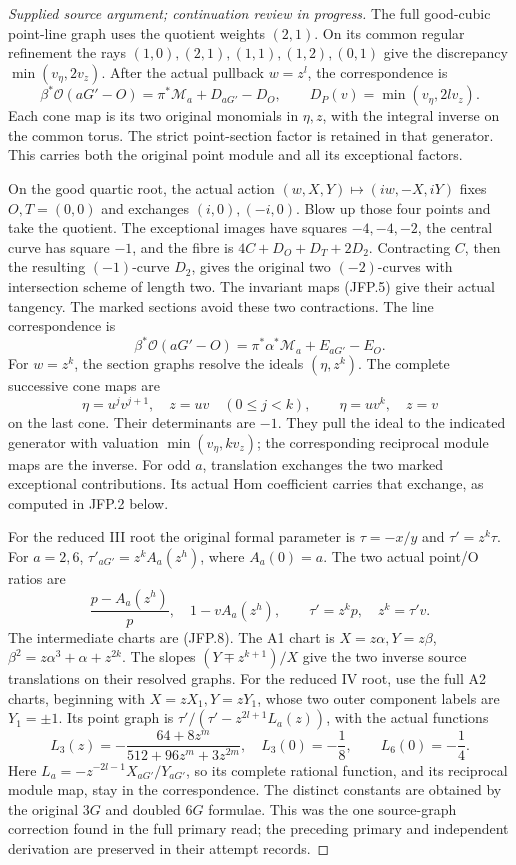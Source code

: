 \begin{proof}[Supplied source argument; continuation review in progress]
The full good-cubic point-line graph uses the quotient weights
\((2,1)\). On its common regular refinement the rays
\((1,0),(2,1),(1,1),(1,2),(0,1)\) give the discrepancy
\(\min(v_\eta,2v_z)\). After the actual pullback \(w=z^l\),
the correspondence is
\[
 \beta^*\mathcal O(aG'-O)=\pi^*\mathcal M_a+D_{aG'}-D_O,
 \qquad D_P(v)=\min(v_\eta,2l v_z).
\tag{JFP.6}
\]
Each cone map is its two original monomials in \(\eta,z\), with
the integral inverse on the common torus. The strict point-section
factor is retained in that generator. This carries both the original
point module and all its exceptional factors.

On the good quartic root, the actual action
\((w,X,Y)\mapsto(iw,-X,iY)\) fixes \(O,T=(0,0)\) and exchanges
\((i,0),(-i,0)\). Blow up those four points and take the quotient.
The exceptional images have squares \(-4,-4,-2\), the central
curve has square \(-1\), and the fibre is
\(4C+D_O+D_T+2D_2\). Contracting \(C\), then the resulting
\((-1)\)-curve \(D_2\), gives the original two \((-2)\)-curves
with intersection scheme of length two. The invariant maps (JFP.5)
give their actual tangency. The marked sections avoid these two
contractions. The line correspondence is
\[
 \beta^*\mathcal O(aG'-O)
 =\pi^*\alpha^*\mathcal M_a+E_{aG'}-E_O.
\tag{JFP.7}
\]
For \(w=z^k\), the section graphs resolve the ideals
\((\eta,z^k)\). The complete successive cone maps are
\[
 \eta=u^jv^{j+1},\quad z=uv\quad(0\le j<k),
 \qquad \eta=uv^k,\quad z=v
\tag{JFP.8}
\]
on the last cone. Their determinants are \(-1\). They pull the
ideal to the indicated generator with valuation
\(\min(v_\eta,k v_z)\); the corresponding reciprocal module maps
are the inverse. For odd \(a\), translation exchanges the two
marked exceptional contributions. Its actual Hom coefficient
carries that exchange, as computed in JFP.2 below.

For the reduced III root the original formal parameter is
\(\tau=-x/y\) and \(\tau'=z^k\tau\). For \(a=2,6\),
\(\tau'_{aG'}=z^kA_a(z^h)\), where \(A_a(0)=a\).
The two actual point/O ratios are
\[
 \frac{p-A_a(z^h)}p,\quad 1-vA_a(z^h),
 \qquad \tau'=z^kp,\quad z^k=\tau'v.
\tag{JFP.9}
\]
The intermediate charts are (JFP.8). The A1 chart is
\(X=z\alpha,Y=z\beta\),
\(\beta^2=z\alpha^3+\alpha+z^{2k}\). The slopes
\((Y\mp z^{k+1})/X\) give the two inverse source translations
on their resolved graphs. For the reduced IV root, use the full
A2 charts, beginning with \(X=zX_1,Y=zY_1\), whose two outer
component labels are \(Y_1=\pm1\). Its point graph is
\(\tau'/(\tau'-z^{2l+1}L_a(z))\), with the actual functions
\[
 L_3(z)=-\frac{64+8z^m}{512+96z^m+3z^{2m}},
 \quad L_3(0)=-\frac18,
 \qquad L_6(0)=-\frac14.
\tag{JFP.10}
\]
Here \(L_a=-z^{-2l-1}X_{aG'}/Y_{aG'}\), so its complete
rational function, and its reciprocal module map, stay in the
correspondence. The distinct constants are obtained by the original
\(3G\) and doubled \(6G\) formulae. This was the one source-graph
correction found in the full primary read; the preceding primary
and independent derivation are preserved in their attempt records.


\end{proof}
